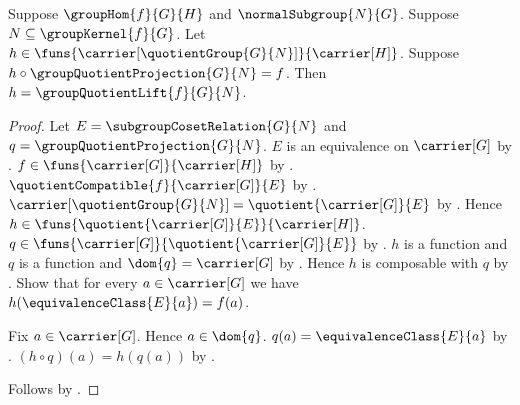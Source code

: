 \begin{theorem}\label{group_quotient_lift_unique}
    Suppose $\groupHom{f}{G}{H}$ and $\normalSubgroup{N}{G}$.
    Suppose $N\subseteq\groupKernel{f}{G}$.
    Let $h\in
        \funs{\carrier[\quotientGroup{G}{N}]}{\carrier[H]}$.
    Suppose
        $h\circ\groupQuotientProjection{G}{N}=f$.
    Then $h=\groupQuotientLift{f}{G}{N}$.
\end{theorem}
\begin{proof}
    Let $E=\subgroupCosetRelation{G}{N}$ and
        $q=\groupQuotientProjection{G}{N}$.
    $E$ is an equivalence on $\carrier[G]$ by
        .
    $f\in\funs{\carrier[G]}{\carrier[H]}$ by
        .
    $\quotientCompatible{f}{\carrier[G]}{E}$ by
        .
    $\carrier[\quotientGroup{G}{N}]=
        \quotient{\carrier[G]}{E}$ by
        .
    Hence $h\in\funs{\quotient{\carrier[G]}{E}}{\carrier[H]}$.
    $q\in\funs{\carrier[G]}{\quotient{\carrier[G]}{E}}$ by
        .
    $h$ is a function and $q$ is a function and
        $\dom{q}=\carrier[G]$ by .
    Hence $h$ is composable with $q$ by
        .
    Show that for every $a\in\carrier[G]$ we have
        $h(\equivalenceClass{E}{a})=f(a)$.
    \begin{subproof}
        Fix $a\in\carrier[G]$.
        Hence $a\in\dom{q}$.
        $q(a)=\equivalenceClass{E}{a}$ by
            .
        $(h\circ q)(a)=h(q(a))$ by .
    \end{subproof}
    Follows by
        .
\end{proof}

